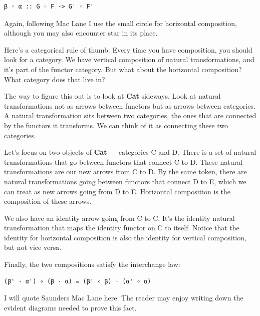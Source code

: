 \begin{verbatim}
β ◦ α :: G ◦ F -> G' ◦ F'
\end{verbatim}
Again, following Mac Lane I use the small circle for horizontal
composition, although you may also encounter star in its place.

Here's a categorical rule of thumb: Every time you have composition, you
should look for a category. We have vertical composition of natural
transformations, and it's part of the functor category. But what about
the horizontal composition? What category does that live in?

The way to figure this out is to look at \textbf{Cat} sideways. Look at
natural transformations not as arrows between functors but as arrows
between categories. A natural transformation sits between two
categories, the ones that are connected by the functors it transforms.
We can think of it as connecting these two categories.

\begin{figure}[H]
\centering
{}
\end{figure}

\noindent
Let's focus on two objects of \textbf{Cat} --- categories C and D. There
is a set of natural transformations that go between functors that
connect C to D. These natural transformations are our new arrows from C
to D. By the same token, there are natural transformations going between
functors that connect D to E, which we can treat as new arrows going
from D to E. Horizontal composition is the composition of these arrows.

We also have an identity arrow going from C to C. It's the identity
natural transformation that maps the identity functor on C to itself.
Notice that the identity for horizontal composition is also the identity
for vertical composition, but not vice versa.

Finally, the two compositions satisfy the interchange law:

\begin{verbatim}
(β' ⋅ α') ∘ (β ⋅ α) = (β' ∘ β) ⋅ (α' ∘ α)
\end{verbatim}

I will quote Saunders Mac Lane here: The reader may enjoy writing down
the evident diagrams needed to prove this fact.

